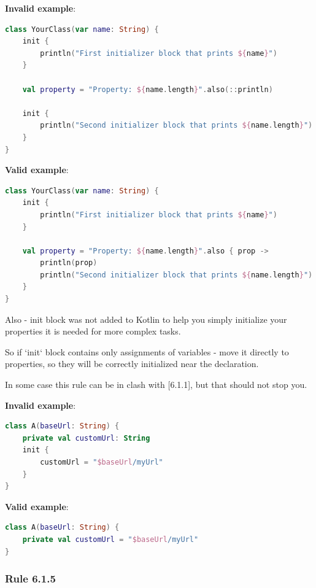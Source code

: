 {{{{\textbf{Invalid example}:

\begin{lstlisting}[language=Kotlin]
class YourClass(var name: String) {    
    init {
        println("First initializer block that prints ${name}")
    }
    
    val property = "Property: ${name.length}".also(::println)
    
    init {
        println("Second initializer block that prints ${name.length}")
    }
}
\end{lstlisting}


\textbf{Valid example}:

\begin{lstlisting}[language=Kotlin]
class YourClass(var name: String) {
    init {
        println("First initializer block that prints ${name}")
    }

    val property = "Property: ${name.length}".also { prop ->
        println(prop)
        println("Second initializer block that prints ${name.length}")
    }
}
\end{lstlisting}


Also - init block was not added to Kotlin to help you simply initialize your properties it is needed for more complex tasks. 

So if `init` block contains only assignments of variables - move it directly to properties, so they will be correctly initialized near the declaration.

In some case this rule can be in clash with [6.1.1], but that should not stop you.



\textbf{Invalid example}:

\begin{lstlisting}[language=Kotlin]
class A(baseUrl: String) {
    private val customUrl: String
    init {
        customUrl = "$baseUrl/myUrl"
    }
}
\end{lstlisting}


\textbf{Valid example}:

\begin{lstlisting}[language=Kotlin]
class A(baseUrl: String) {
    private val customUrl = "$baseUrl/myUrl"
}
\end{lstlisting}


\subsubsection*{\textbf{Rule 6.1.5}}
\leavevmode\newline

}}}}
